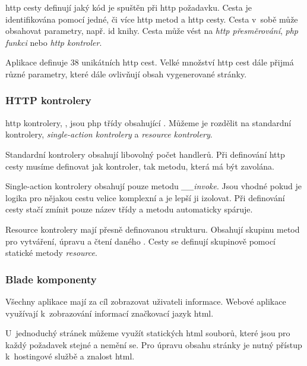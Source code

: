 \acrshort{http} cesty definují jaký kód je spuštěn při \acrshort{http} požadavku. Cesta je identifikována pomocí jedné, či více \acrshort{http} metod a \acrshort{http} cesty. Cesta v~sobě může obsahovat parametry, např. id knihy. Cesta může vést na \emph{\acrshort{http} přesměrování}, \emph{\acrshort{php} funkci} nebo \emph{\acrshort{http} kontroler}.

Aplikace \bso{} definuje 38 unikátních \acrshort{http} cest. Velké množství \acrshort{http} cest dále přijmá různé parametry, které dále ovlivňují obsah vygenerované stránky.

\subsubsection{HTTP kontrolery}

\acrshort{http} kontrolery, \inlaravel, jsou \acrshort{php} třídy obsahující . Můžeme je rozdělit na standardní kontrolery, \emph{single-action kontrolery}\cite{laravel-controller-single-action} a \emph{resource kontrolery}\cite{laravel-controller-resource}.

Standardní kontrolery obsahují libovolný počet handlerů. Při definování \acrshort{http} cesty musíme definovat jak kontroler, tak metodu, která má být zavolána.

Single-action kontrolery obsahují pouze metodu \emph{\_\_invoke}. Jsou vhodné pokud je logika pro nějakou cestu velice komplexní a je lepší ji izolovat. Při definování cesty stačí zmínit pouze název třídy a  metodu automaticky spáruje.

Resource kontrolery mají přesně definovanou strukturu. Obsahují skupinu metod pro vytváření, úpravu a čtení daného . Cesty se definují skupinově pomocí statické metody \emph{resource}.

\subsubsection{Blade komponenty}

Všechny aplikace mají za cíl zobrazovat uživateli informace. Webové aplikace využívají k~zobrazování informací značkovací jazyk \acrshort{html}.

U~jednoduchý stránek můžeme využít statických \acrshort{html} souborů, které jsou pro každý požadavek stejné a nemění se. Pro úpravu obsahu stránky je nutný přístup k~hostingové službě a znalost \acrshort{html}.

